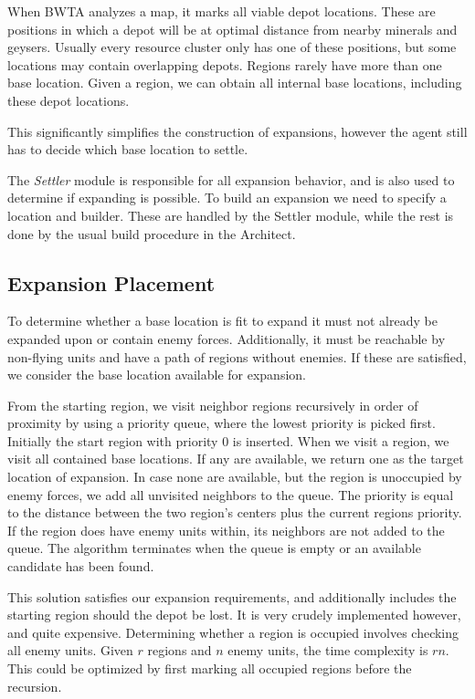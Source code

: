 When BWTA analyzes a map, it marks all viable depot locations. These are positions in which a depot will be at optimal distance from nearby minerals and geysers. Usually every resource cluster only has one of these positions, but some locations may contain overlapping depots. Regions rarely have more than one base location. Given a region, we can obtain all internal base locations, including these depot locations.

This significantly simplifies the construction of expansions, however the agent still has to decide which base location to settle.

The \emph{Settler} module is responsible for all expansion behavior, and is also used to determine if expanding is possible. To build an expansion we need to specify a location and builder. These are handled by the Settler module, while the rest is done by the usual build procedure in the Architect.

	\subsection*{Expansion Placement}
	To determine whether a base location is fit to expand it must not already be expanded upon or contain enemy forces. Additionally, it must be reachable by non-flying units and have a path of regions without enemies. If these are satisfied, we consider the base location available for expansion.
	
	From the starting region, we visit neighbor regions recursively in order of proximity by using a priority queue, where the lowest priority is picked first. Initially the start region with priority 0 is inserted. When we visit a region, we visit all contained base locations. If any are available, we return one as the target location of expansion. In case none are available, but the region is unoccupied by enemy forces, we add all unvisited neighbors to the queue. The priority is equal to the distance between the two region's centers plus the current regions priority. If the region does have enemy units within, its neighbors are not added to the queue. The algorithm terminates when the queue is empty or an available candidate has been found.

	This solution satisfies our expansion requirements, and additionally includes the starting region should the depot be lost. It is very crudely implemented however, and quite expensive. Determining whether a region is occupied involves checking all enemy units. Given $r$ regions and $n$ enemy units, the time complexity is $rn$. This could be optimized by first marking all occupied regions before the recursion.
	
